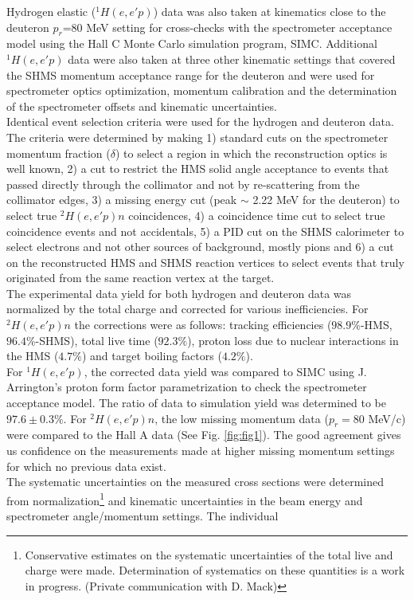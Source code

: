 \indent Hydrogen elastic ($^{1}H(e,e'p)$) data was also taken at kinematics close to the deuteron $p_{r}$=80 MeV setting for cross-checks with the spectrometer acceptance model using the  Hall C Monte Carlo
simulation program, SIMC. Additional $^{1}H(e,e'p)$ data were also taken at three other kinematic settings that covered the SHMS momentum acceptance range for the deuteron and were used for spectrometer optics optimization, 
momentum calibration and the determination of the spectrometer offsets and kinematic uncertainties\cite{cyero_specKinUnc,cyero_SHMSOptics}. \\
\indent Identical event selection criteria were used for the hydrogen and deuteron data. The criteria were determined by making 1) standard cuts on the spectrometer momentum fraction ($\delta$) to select a region in which the reconstruction optics
is well known, 2) a cut to restrict the HMS solid angle acceptance to events that passed directly through the collimator and not by re-scattering from the collimator edges, 3) a missing
energy cut (peak $\sim$ 2.22 MeV for the deuteron) to select true $^{2}H(e,e'p)n$ coincidences, 4) a coincidence time cut to select true coincidence events and not accidentals,  5) a PID cut on the
SHMS calorimeter to select electrons and not other sources of background, mostly pions and 6) a cut on the reconstructed HMS and SHMS reaction vertices to select events that truly
originated from the same reaction vertex at the target. \\
\indent The experimental data yield for both hydrogen and deuteron data was normalized by the total charge and corrected for various inefficiencies. For $^{2}H(e,e'p)n$ the corrections were as follows: tracking efficiencies ($98.9 \%$-HMS, $96.4 \%$-SHMS),
total live time ($92.3 \%$), proton loss due to nuclear interactions in the HMS ($4.7 \%$)\cite{cyero_pAbs} and target boiling factors ($4.2 \%$)\cite{cyero_tgtBoil}. \\
\indent For $^{1}H(e,e'p)$, the corrected data yield was compared to SIMC using J. Arrington's proton form factor parametrization\cite{PhysRevC.69.022201} to check the spectrometer acceptance
model. The ratio of data to simulation yield was determined to be $97.6\pm0.3 \%$. For $^{2}H(e,e'p)n$, the low missing momentum data ($p_{r}=80$ MeV/c) were compared to the Hall A data (See Fig. \ref{fig:fig1}).
The good agreement gives us confidence on the measurements made at higher missing momentum settings for which no previous data exist. \\
\indent The systematic uncertainties on the measured cross sections were determined from normalization\footnote{Conservative estimates on the systematic uncertainties of the total live and charge were made.
Determination of systematics on these quantities is a work in progress. (Private communication with D. Mack)} and kinematic uncertainties in the beam energy and spectrometer angle/momentum settings. The individual
